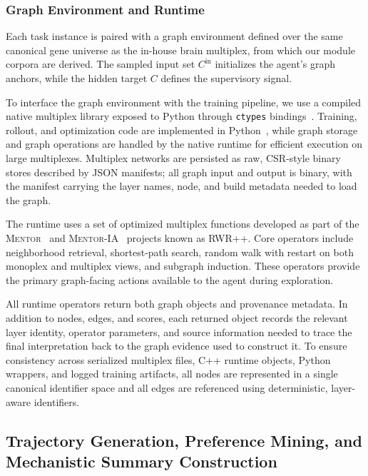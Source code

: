 \documentclass[thesis,letterpaper,12pt]{utthesis}
\begin{document}
\subsubsection{Graph Environment and Runtime}\label{sec:graph-runtime}
Each task instance is paired with a graph environment defined over the same canonical gene universe as the in-house brain multiplex, from which our module corpora are derived. The sampled input set $C^{\text{in}}$ initializes the agent's graph anchors, while the hidden target $C$ defines the supervisory signal.

To interface the graph environment with the training pipeline, we use a compiled native multiplex library exposed to Python through \texttt{ctypes} bindings~\cite{cpp}. Training, rollout, and optimization code are implemented in Python~\cite{python}, while graph storage and graph operations are handled by the native runtime for efficient execution on large multiplexes. Multiplex networks are persisted as raw, CSR-style binary stores described by JSON manifests; all graph input and output is binary, with the manifest carrying the layer names, node, and build metadata needed to load the graph.

The runtime uses a set of optimized multiplex functions developed as part of the \textsc{Mentor}~\cite{mentor} and \textsc{Mentor-IA}~\cite{mentor-ia} projects known as RWR++. Core operators include neighborhood retrieval, shortest-path search, random walk with restart on both monoplex and multiplex views, and subgraph induction. These operators provide the primary graph-facing actions available to the agent during exploration.

All runtime operators return both graph objects and provenance metadata. In addition to nodes, edges, and scores, each returned object records the relevant layer identity, operator parameters, and source information needed to trace the final interpretation back to the graph evidence used to construct it. To ensure consistency across serialized multiplex files, C++ runtime objects, Python wrappers, and logged training artifacts, all nodes are represented in a single canonical identifier space and all edges are referenced using deterministic, layer-aware identifiers.

\subsection{Trajectory Generation, Preference Mining, and Mechanistic Summary Construction}\label{sec:trajectory}
\end{document}
